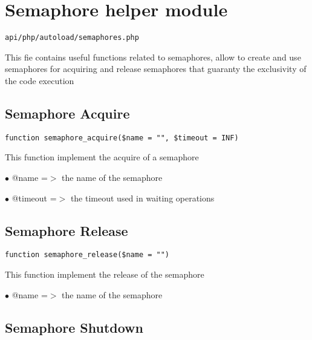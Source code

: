 \documentclass[a4paper]{book}
\begin{document}
\hypertarget{toc234}{}
\section{Semaphore helper module}

\begin{lstlisting}
api/php/autoload/semaphores.php
\end{lstlisting}

This fie contains useful functions related to semaphores, allow to create and use semaphores
for acquiring and release semaphores that guaranty the exclusivity of the code execution

\hypertarget{toc235}{}
\subsection{Semaphore Acquire}

\begin{lstlisting}
function semaphore_acquire($name = "", $timeout = INF)
\end{lstlisting}

This function implement the acquire of a semaphore

\begin{compactitem}
\item[\color{myblue}$\bullet$] @name    =$>$ the name of the semaphore
\item[\color{myblue}$\bullet$] @timeout =$>$ the timeout used in waiting operations
\end{compactitem}

\hypertarget{toc236}{}
\subsection{Semaphore Release}

\begin{lstlisting}
function semaphore_release($name = "")
\end{lstlisting}

This function implement the release of the semaphore

\begin{compactitem}
\item[\color{myblue}$\bullet$] @name =$>$ the name of the semaphore
\end{compactitem}

\hypertarget{toc237}{}
\subsection{Semaphore Shutdown}
\end{document}
